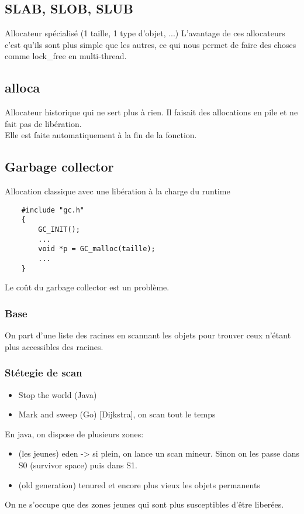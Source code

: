 \documentclass[11pt]{article}
\begin{document}
\subsection{SLAB, SLOB, SLUB}
Allocateur spécialisé (1 taille, 1 type d'objet, ...)
L'avantage de ces allocateurs c'est qu'ils sont plus simple que les autres, ce qui nous permet de faire des choses comme lock\_free en multi-thread.

\subsection{alloca}
Allocateur historique qui ne sert plus à rien. Il faisait des allocations en pile et ne fait pas de libération.\\
Elle est faite automatiquement à la fin de la fonction.

\pagebreak

\subsection{Garbage collector}
Allocation classique avec une libération à la charge du runtime
\begin{verbatim}
    #include "gc.h"
    {
        GC_INIT();
        ...
        void *p = GC_malloc(taille);
        ...
    }
\end{verbatim}

Le coût du garbage collector est un problème.\\
\subsubsection{Base}
On part d'une liste des racines en scannant les objets pour trouver ceux n'étant plus accessibles des racines.

\subsubsection{Stétegie de scan}
\begin{itemize}
    \item Stop the world (Java)
    \item Mark and sweep (Go) [Dijkstra], on scan tout le temps
\end{itemize}

En java, on dispose de plusieurs zones:
\begin{itemize}
    \item (les jeunes) eden -> si plein, on lance un scan mineur. Sinon on les passe dans S0 (survivor space) puis dans S1.
    \item (old generation) tenured et encore plus vieux les objets permanents
\end{itemize}
On ne s'occupe que des zones jeunes qui sont plus susceptibles d'être liberées.
\end{document}
